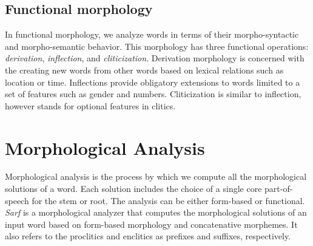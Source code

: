\begin{appendices}
\subsection{Functional morphology}
In functional morphology, we analyze words in terms of their 
morpho-syntactic and morpho-semantic behavior. 
This morphology has three functional operations: 
\textit{derivation}, \textit{inflection}, and \textit{cliticization}.
Derivation morphology is concerned with the creating new words from other words 
based on lexical relations such as location or time. 
Inflections provide obligatory extensions to words limited to 
a set of features such as gender and numbers. 
Cliticization is similar to inflection, 
however stands for optional features in clitics.

\section{Morphological Analysis}

Morphological analysis is the process by which we compute all the morphological solutions of a word. 
Each solution includes the choice of a single core part-of-speech for the stem or root. 
The analysis can be either form-based or functional.
\textit{Sarf} is a morphological analyzer that 
computes the morphological solutions of an input word 
based on form-based morphology and concatenative morphemes. 
It also refers to the proclitics and enclitics as prefixes and suffixes, respectively.

\end{appendices}

%

